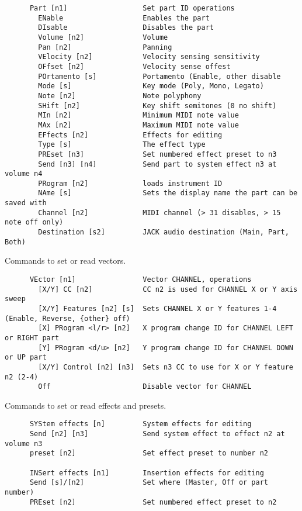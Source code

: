 \begin{verbatim}
      Part [n1]                  Set part ID operations
        ENable                   Enables the part
        DIsable                  Disables the part
        Volume [n2]              Volume
        Pan [n2]                 Panning
        VElocity [n2]            Velocity sensing sensitivity
        OFfset [n2]              Velocity sense offest
        POrtamento [s]           Portamento (Enable, other disable
        Mode [s]                 Key mode (Poly, Mono, Legato)
        Note [n2]                Note polyphony
        SHift [n2]               Key shift semitones (0 no shift)
        MIn [n2]                 Minimum MIDI note value
        MAx [n2]                 Maximum MIDI note value
        EFfects [n2]             Effects for editing
        Type [s]                 The effect type
        PREset [n3]              Set numbered effect preset to n3
        Send [n3] [n4]           Send part to system effect n3 at volume n4
        PRogram [n2]             loads instrument ID
        NAme [s]                 Sets the display name the part can be saved with
        Channel [n2]             MIDI channel (> 31 disables, > 15 note off only)
        Destination [s2]         JACK audio destination (Main, Part, Both)
\end{verbatim}

   Commands to set or read vectors.

\begin{verbatim}
      VEctor [n1]                Vector CHANNEL, operations
        [X/Y] CC [n2]            CC n2 is used for CHANNEL X or Y axis sweep
        [X/Y] Features [n2] [s]  Sets CHANNEL X or Y features 1-4 (Enable, Reverse, {other} off)
        [X] PRogram <l/r> [n2]   X program change ID for CHANNEL LEFT or RIGHT part
        [Y] PRogram <d/u> [n2]   Y program change ID for CHANNEL DOWN or UP part
        [X/Y] Control [n2] [n3]  Sets n3 CC to use for X or Y feature n2 (2-4)
        Off                      Disable vector for CHANNEL
\end{verbatim}

   Commands to set or read effects and presets.

\begin{verbatim}
      SYStem effects [n]         System effects for editing
      Send [n2] [n3]             Send system effect to effect n2 at volume n3
      preset [n2]                Set effect preset to number n2

      INSert effects [n1]        Insertion effects for editing
      Send [s]/[n2]              Set where (Master, Off or part number)
      PREset [n2]                Set numbered effect preset to n2
\end{verbatim}

